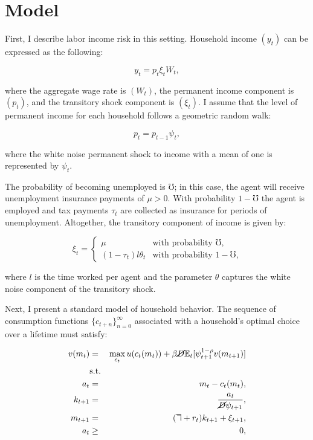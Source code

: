 \documentclass[\econtexRoot/Chp1proposal]{subfiles}
\begin{document}
\onlyinsubfile{\setcounter{section}{2}}
\section{Model}
\notinsubfile{\label{sec:Model}}

\par First, I describe labor income risk in this setting. Household income $(y_t)$ can be expressed as the following:

$$ y_t = p_t \xi_t W_t, $$

where the aggregate wage rate is $(W_t)$, the permanent income component is $(p_t)$, and the transitory shock component is $(\xi_t)$. I assume that the level of permanent income for each household follows a geometric random walk:

$$ p_t = p_{t-1} \psi_{t}, $$

where the white noise permanent shock to income with a mean of one is represented by $\psi_t$.

\par The probability of becoming unemployed is $\mho$; in this case, the agent will receive unemployment insurance payments of $\mu > 0$. With probability $1 - \mho$ the agent is employed and tax payments $\tau_t$ are collected as insurance for periods of unemployment. Altogether, the transitory component of income is given by:

\begin{equation*}
\xi_t =
    \begin{cases}
        \mu & \text{with probability $\mho$,} \\
        (1-\tau_t) l \theta_t & \text{with probability $1-\mho$,}
    \end{cases}
\end{equation*}

where $l$ is the time worked per agent and the parameter $\theta$ captures the white noise component of the transitory shock.

\par Next, I present a standard model of household behavior. The sequence of consumption functions $\{c_{t+n}\}^{\infty}_{n=0}$ associated with a household's optimal choice over a lifetime must satisfy:

\begin{eqnarray*}
  v(m_t) &=& \max_{c_t} u(c_t(m_t)) + \beta \cancel{D} \mathbb{E}_{t}[\psi_{t+1}^{1-\rho}v(m_{t+1})] \\
  &\text{s.t.}& \\
  a_t &=& m_t - c_t(m_t), \\
  k_{t+1} &=& \frac{a_t}{\cancel{D}\psi_{t+1}}, \\
  m_{t+1} &=& (\daleth + r_t)k_{t+1} + \xi_{t+1}, \\
  a_t &\geq& 0,
\end{eqnarray*}
\end{document}
